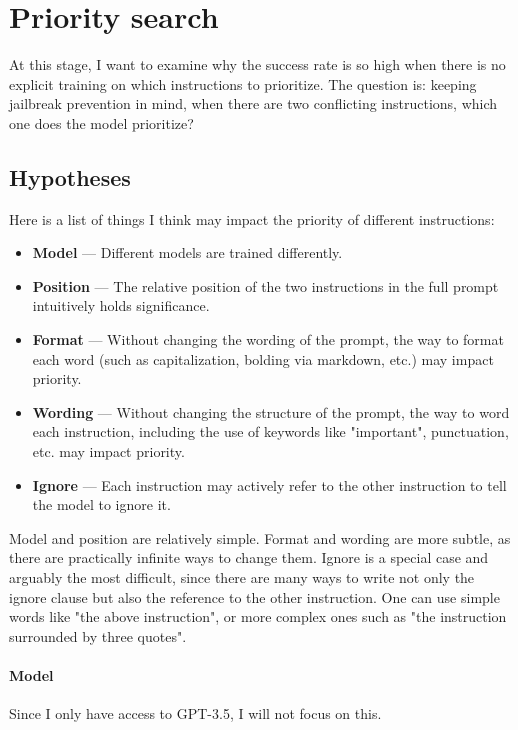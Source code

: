 \section{Priority search}%
\label{sec:Priority search}

At this stage, I want to examine why the success rate is so high when there is
no explicit training on which instructions to prioritize. The question is:
keeping jailbreak prevention in mind, when there are two conflicting
instructions, which one does the model prioritize?


\subsection{Hypotheses}

Here is a list of things I think may impact the priority of different
instructions:

\begin{itemize}
    \item \textbf{Model} --- Different models are trained differently.
    \item \textbf{Position} --- The relative position of the two instructions in
        the full prompt intuitively holds significance.
    \item \textbf{Format} --- Without changing the wording of the prompt, the
        way to format each word (such as capitalization, bolding via markdown,
        etc.) may impact priority.
    \item \textbf{Wording} --- Without changing the structure of the prompt,
        the way to word each instruction, including the use of keywords like
        "important", punctuation, etc. may impact priority.
    \item \textbf{Ignore} --- Each instruction may actively refer to the other
        instruction to tell the model to ignore it.
\end{itemize}

Model and position are relatively simple. Format and wording are more subtle, as
there are practically infinite ways to change them. Ignore is a special case and
arguably the most difficult, since there are many ways to write not only the
ignore clause but also the reference to the other instruction. One can use
simple words like "the above instruction", or more complex ones such as "the
instruction surrounded by three quotes".

\paragraph{Model} Since I only have access to GPT-3.5, I will not focus on this.

